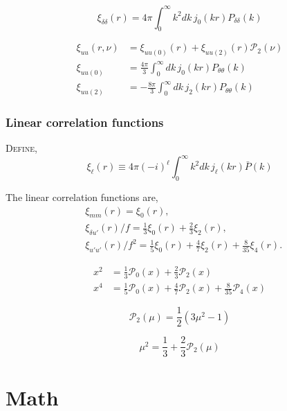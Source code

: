 \documentclass[a4paper,11pt, fleqn]{article}
\begin{document}
\begin{equation}
  \xi_{\delta\delta}(r) = 4\pi \int_0^\infty \! k^2 dk\,
  j_0(kr) P_{\delta\delta}(k)
\end{equation}

\begin{align}
  \xi_{uu}(r, \nu) &= \xi_{uu(0)}(r) + \xi_{uu(2)}(r) \mathcal{P}_2(\nu)\\
  \xi_{uu(0)} &= \frac{4\pi}{3} \int_0^\infty \!dk\,
                   j_0(kr) P_{\theta\theta}(k)\\
  \xi_{uu(2)} &= -\frac{8\pi}{3} \int_0^\infty \! dk\,
                   j_2(kr) P_{\theta\theta}(k)
\end{align}

\clearpage
\subsubsection{Linear correlation functions}
\textsc{Define},
%
\begin{equation}
  \xi_{\ell}(r)
  \equiv 4\pi (-i)^\ell \int_0^\infty \! k^2 dk \, j_\ell(kr) \bar{P}(k)
\end{equation}


The linear correlation functions are,
\begin{align}
  &\xi_{mm}(r) = \xi_0(r),\\
  &\xi_{\delta u'}(r)/f = \frac{1}{3} \xi_0(r) + \frac{2}{3} \xi_2(r),\\
  &\xi_{u'u'}(r)/f^2 = \frac{1}{5} \xi_0(r) + \frac{4}{7} \xi_2(r)
                      +\frac{8}{35} \xi_4(r).
\end{align}

\begin{align}
  x^2 &= \frac{1}{3} \mathcal{P}_0(x) + \frac{2}{3} \mathcal{P}_2(x)\\
  x^4 &= \frac{1}{5}\mathcal{P}_0(x)
  + \frac{4}{7} \mathcal{P}_2(x)
  + \frac{8}{35} \mathcal{P}_4(x)
\end{align}
  
\clearpage
\begin{equation}
  \mathcal{P}_2(\mu) = \frac{1}{2}\left( 3 \mu^2 - 1 \right)
\end{equation}

\begin{equation}
  \mu^2 = \frac{1}{3} + \frac{2}{3} \mathcal{P}_2(\mu)
\end{equation}





\clearpage
\section{Math}
\end{document}
